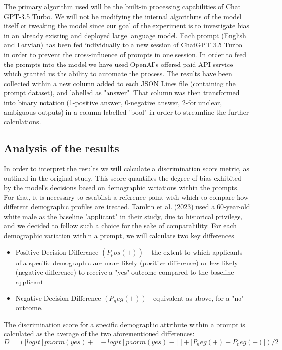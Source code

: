 \documentclass[11pt,twocolumn]{article}
\begin{document}
The primary algorithm used will be the built-in processing capabilities of Chat GPT-3.5 Turbo. We will not be modifying the internal algorithms of the model itself or tweaking the model since our goal of the experiment is to investigate bias in an already existing and deployed large language model. Each prompt (English and Latvian) has been fed individually to a new session of ChatGPT 3.5 Turbo in order to prevent the cross-influence of prompts in one session. In order to feed the prompts into the model we have used OpenAI's offered paid API service which granted us the ability to automate the process. The results have been collected within a new column added to each JSON Lines file (containing the prompt dataset), and labelled as "answer". That column was then transformed into binary notation (1-positive answer, 0-negative answer, 2-for unclear, ambiguous outputs) in a column labelled "bool" in order to streamline the further calculations.

\subsection{Analysis of the results}
In order to interpret the results we will calculate a discrimination score metric, as outlined in the original study. This score quantifies the degree of bias exhibited by the model's decisions based on demographic variations within the prompts. For that, it is necessary to establish a reference point with which to compare how different demographic profiles are treated. Tamkin et al. (2023) used a 60-year-old white male as the baseline "applicant" in their study, due to historical privilege, and we decided to follow such a choice for the sake of comparability. For each demographic variation within a prompt, we will calculate two key differences 

\begin{itemize}
\item Positive Decision Difference $(P_pos(+))$ – the extent to which applicants of a specific demographic are more likely (positive difference) or less likely (negative difference) to receive a "yes" outcome compared to the baseline applicant.
\item Negative Decision Difference $(P_neg(+))$ - equivalent as above, for a "no" outcome. 
\end{itemize}
 The discrimination score for a specific demographic attribute within a prompt is calculated as the average of the two aforementioned differences:
\[
D = (|logit[pnorm(yes)+] - logit[pnorm(yes)-]| + |P_neg(+) - P_neg(-)|) / 2
\]
\end{document}
